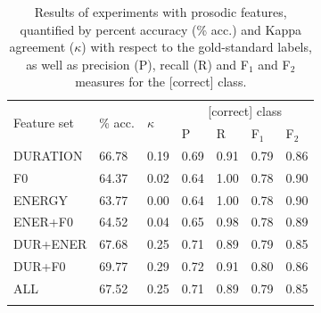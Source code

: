 		\begin{table}
			\centering
			\caption[Results of experiments with prosodic features]{Results of experiments with prosodic features,
			quantified by percent accuracy (\% acc.) and Kappa agreement ($\kappa$) with respect to the gold-standard labels, as well as precision (P), recall (R) and F$_1$ and F$_2$ measures for the [correct] class. 
			}
			\begin{tabularx}{.8\textwidth}{lXXXXXX}			
			
			\toprule
			\multirow{2}{*}{Feature set} & \multirow{2}{*}{\% acc.} & \multirow{2}{*}{$\kappa$} & \multicolumn{4}{c}{[correct] class} \\
			 \cmidrule(lr){4-7}
			& & & P & R & F$_1$ & F$_2$ \\
			\midrule
		
DURATION	&	66.78	&	0.19	&	0.69	&	0.91	&	0.79	&	0.86	\\
F0	&	64.37	&	0.02	&	0.64	&	1.00	&	0.78	&	0.90	\\
ENERGY	&	63.77	&	0.00	&	0.64	&	1.00	&	0.78	&	0.90	\\
\addlinespace											
ENER+F0	&	64.52	&	0.04	&	0.65	&	0.98	&	0.78	&	0.89	\\
DUR+ENER	&	67.68	&	0.25	&	0.71	&	0.89	&	0.79	&	0.85	\\
DUR+F0	&	69.77	&	0.29	&	0.72	&	0.91	&	0.80	&	0.86	\\
\addlinespace											
ALL	&	67.52	&	0.25	&	0.71	&	0.89	&	0.79	&	0.85	\\		
			\bottomrule
			\label{tab:results:prosody}
			\end{tabularx}
		\end{table}
		
